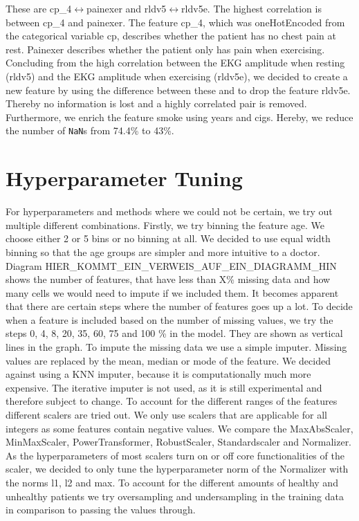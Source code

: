 These are cp\_4$\leftrightarrow$painexer and rldv5$\leftrightarrow$rldv5e. The highest correlation is between cp\_4 and painexer. The feature cp\_4, which was oneHotEncoded from the categorical variable cp, describes whether the patient has no chest pain at rest. Painexer describes whether the patient only has pain when exercising. 
Concluding from the high correlation between the EKG amplitude when resting (rldv5) and the EKG amplitude when exercising (rldv5e), we decided to create a new feature by using the difference between these and to drop the feature rldv5e. Thereby no information is lost and a highly correlated pair is removed. Furthermore, we enrich the feature smoke using years and cigs. Hereby, we reduce the number of \texttt{NaN}s from 74.4\% to 43\%. 

\section{Hyperparameter Tuning }
For hyperparameters and methods where we could not be certain, we try out multiple different combinations.
Firstly, we try binning the feature age. We choose either 2 or 5 bins or no binning at all. We decided to use equal width binning so that the age groups are simpler and more intuitive to a doctor.
Diagram HIER\_KOMMT\_EIN\_VERWEIS\_AUF\_EIN\_DIAGRAMM\_HIN shows the number of features, that have less than X\% missing data and how many cells we would need to impute if we included them. It becomes apparent that there are certain steps where the number of features goes up a lot. To decide when a feature is included based on the number of missing values, we try the steps 0, 4, 8, 20, 35, 60, 75 and 100 \% in the model. They are shown as vertical lines in the graph.
To impute the missing data we use a simple imputer. Missing values are replaced by the mean, median or mode of the feature. We decided against using a KNN imputer, because it is computationally much more expensive. The iterative imputer is not used, as it is still experimental and therefore subject to change.
To account for the different ranges of the features different scalers are tried out. We only use scalers that are applicable for all integers as some features contain negative values. 
We compare the MaxAbsScaler, MinMaxScaler, PowerTransformer, RobustScaler, Standardscaler and Normalizer. As the hyperparameters of most scalers turn on or off core functionalities of the scaler, we decided to only tune the hyperparameter norm of the Normalizer with the norms l1, l2 and max.
To account for the different amounts of healthy and unhealthy patients we try oversampling and undersampling in the training data in comparison to passing the values through.




